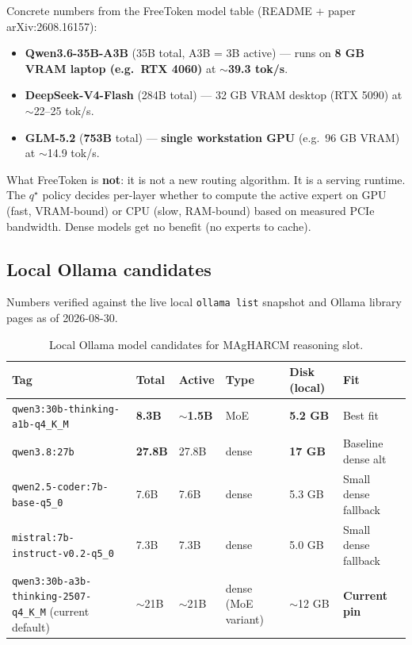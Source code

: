 Concrete numbers from the FreeToken model table (README + paper
arXiv:2608.16157):

\begin{itemize}
\item \textbf{Qwen3.6-35B-A3B} (35B total, A3B = 3B active) --- runs on \textbf{8 GB VRAM
  laptop (e.g.\ RTX 4060)} at \textbf{$\sim$39.3 tok/s}.
\item \textbf{DeepSeek-V4-Flash} (284B total) --- 32 GB VRAM desktop (RTX 5090) at
  $\sim$22--25 tok/s.
\item \textbf{GLM-5.2} (\textbf{753B} total) --- \textbf{single workstation GPU}
  (e.g.\ 96 GB VRAM) at $\sim$14.9 tok/s.
\end{itemize}

What FreeToken is \textbf{not}: it is not a new routing algorithm. It is a
serving runtime. The $q^\star$ policy decides per-layer whether to compute the
active expert on GPU (fast, VRAM-bound) or CPU (slow, RAM-bound) based on
measured PCIe bandwidth. Dense models get no benefit (no experts to cache).

\subsection{Local Ollama candidates}

Numbers verified against the live local \texttt{ollama list} snapshot and
Ollama library pages as of 2026-08-30.

\begin{table}[h]
\centering
\begin{tabular}{llllll}
\toprule
Tag & Total & Active & Type & Disk (local) & Fit \\
\midrule
\texttt{qwen3:30b-thinking-a1b-q4\_K\_M} & \textbf{8.3B} & \textbf{$\sim$1.5B} & MoE & \textbf{5.2 GB} & Best fit \\
\texttt{qwen3.8:27b} & \textbf{27.8B} & 27.8B & dense & \textbf{17 GB} & Baseline dense alt \\
\texttt{qwen2.5-coder:7b-base-q5\_0} & 7.6B & 7.6B & dense & 5.3 GB & Small dense fallback \\
\texttt{mistral:7b-instruct-v0.2-q5\_0} & 7.3B & 7.3B & dense & 5.0 GB & Small dense fallback \\
\texttt{qwen3:30b-a3b-thinking-2507-q4_K_M} (current default) & $\sim$21B & $\sim$21B & dense (MoE variant) & $\sim$12 GB & \textbf{Current pin} \\
\bottomrule
\end{tabular}
\caption{Local Ollama model candidates for MAgHARCM reasoning slot.}
\end{table}

